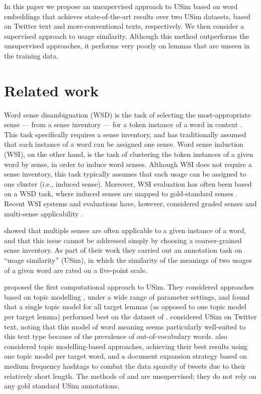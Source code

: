 \documentclass[11pt]{article}
\begin{document}
In this paper we propose an unsupervised approach to USim based on
word embeddings \citep{Mikolov+:2013b} that achieves state-of-the-art
results over two USim datasets, based on Twitter text and
more-conventional texts, respectively.  We then consider a supervised
approach to usage similarity. Although this method outperforms the
unsupervised approaches, it performs very poorly on lemmas that are
unseen in the training data.

\section{Related work\label{sec:rw}}

Word sense disambiguation (WSD) is the task of selecting the
most-appropriate sense --- from a sense inventory --- for a token
instance of a word in context \citep{Navigli:2009}. This task
specifically requires a sense inventory, and has traditionally assumed
that each instance of a word can be assigned one sense.  Word sense
induction (WSI), on the other hand, is the task of clustering the
token instances of a given word by sense, in order to induce word
senses. Although WSI does not require a sense inventory, this task
typically assumes that each usage can be assigned to one cluster
(i.e., induced sense). Moreover, WSI evaluation has often been based
on a WSD task, where induced senses are mapped to gold-standard senses
\citep{Agirre:Soroa:2007,Manandhar+:2010}. Recent WSI systems and
evaluations have, however, considered graded senses and multi-sense
applicability \citep{Jurgens:Klapaftis:2013}.

\cite{Erk2009b} showed that multiple senses are often applicable to a
given instance of a word, and that this issue cannot be addressed
simply by choosing a coarser-grained sense inventory.  As part of
their work they carried out an annotation task on ``usage similarity''
(USim), in which the similarity of the meanings of two usages of a
given word are rated on a five-point scale.

\cite{LuiBaldwin2012} proposed the first computational approach to
USim. They considered approaches based on topic modelling
\citep{Blei2003}, under a wide range of parameter settings, and found
that a single topic model for all target lemmas (as opposed to one
topic model per target lemma) 
performed best on the dataset of \cite{Erk2009b}. \cite{Gella+:2013}
considered USim on Twitter text, noting that this model of word
meaning seems particularly well-suited to this text type because of
the prevalence of out-of-vocabulary words. \citeauthor{Gella+:2013}
also considered topic modelling-based approaches, achieving their best
results using one topic model per target word, and a document
expansion strategy based on medium frequency hashtags to combat the
data sparsity of tweets due to their relatively short length. The
methods of \citeauthor{LuiBaldwin2012} and \citeauthor{Gella+:2013}
are unsupervised; they do not rely on any gold standard USim
annotations.
\end{document}
